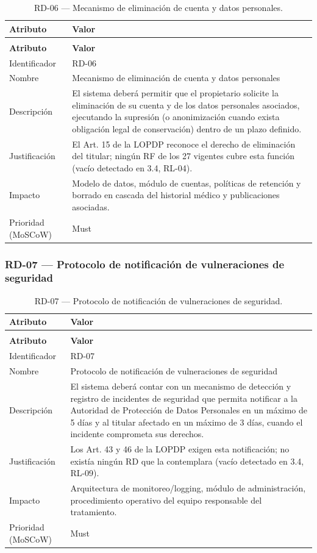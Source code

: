 \documentclass[journal,onecolumn]{IEEEtran}
\makeatletter
\newenvironment{atributos}[2]{%
	\small
	\begin{longtable}{@{}>{\raggedright\arraybackslash}p{4.2cm} >{\raggedright\arraybackslash}p{11.2cm}@{}}
		\caption{#2}\label{tab:#1}\\
		\toprule
		\textbf{Atributo} & \textbf{Valor} \\
		\midrule
		\endfirsthead
		\multicolumn{2}{@{}l}{\small\itshape (continuación)}\\
		\toprule
		\textbf{Atributo} & \textbf{Valor} \\
		\midrule
		\endhead
		\bottomrule
		\endlastfoot
	}{%
	\end{longtable}
	\normalsize
}
\makeatother
\begin{document}
	\begin{atributos}{RD-06}{RD-06 --- Mecanismo de eliminación de cuenta y datos personales.}
		Identificador & RD-06 \\
		Nombre & Mecanismo de eliminación de cuenta y datos personales \\
		Descripción & El sistema deberá permitir que el propietario solicite la eliminación de su cuenta y de los datos personales asociados, ejecutando la supresión (o anonimización cuando exista obligación legal de conservación) dentro de un plazo definido. \\
		Justificación & El Art. 15 de la LOPDP reconoce el derecho de eliminación del titular; ningún RF de los 27 vigentes cubre esta función (vacío detectado en 3.4, RL-04). \\
		Impacto & Modelo de datos, módulo de cuentas, políticas de retención y borrado en cascada del historial médico y publicaciones asociadas. \\
		Prioridad (MoSCoW) & Must \\
	\end{atributos}
	
	
	\subsubsection{RD-07 --- Protocolo de notificación de vulneraciones de seguridad}
	
	\begin{atributos}{RD-07}{RD-07 --- Protocolo de notificación de vulneraciones de seguridad.}
		Identificador & RD-07 \\
		Nombre & Protocolo de notificación de vulneraciones de seguridad \\
		Descripción & El sistema deberá contar con un mecanismo de detección y registro de incidentes de seguridad que permita notificar a la Autoridad de Protección de Datos Personales en un máximo de 5 días y al titular afectado en un máximo de 3 días, cuando el incidente comprometa sus derechos. \\
		Justificación & Los Art. 43 y 46 de la LOPDP exigen esta notificación; no existía ningún RD que la contemplara (vacío detectado en 3.4, RL-09). \\
		Impacto & Arquitectura de monitoreo/logging, módulo de administración, procedimiento operativo del equipo responsable del tratamiento. \\
		Prioridad (MoSCoW) & Must \\
	\end{atributos}
	
\end{document}
